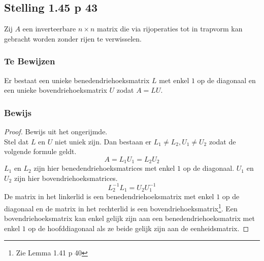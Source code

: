 \documentclass[lineaire_algebra_oplossingen.tex]{subfiles}
\begin{document}
\subsection{Stelling 1.45 p 43}
\label{1.45}
Zij $A$ een inverteerbare $n\times n$ matrix die via rijoperaties tot in trapvorm kan gebracht worden zonder rijen te verwisselen.

\subsubsection*{Te Bewijzen}
Er bestaat een unieke benedendriehoeksmatrix $L$ met enkel $1$ op de diagonaal en een unieke bovendriehoeksmatrix $U$ zodat $A=LU$.

\subsubsection*{Bewijs}
\begin{proof}
Bewijs uit het ongerijmde.\\
Stel dat $L$ en $U$ niet uniek zijn. Dan bestaan er $L_1 \neq L_2,U_1 \neq U_2$ zodat de volgende formule geldt.
\[
A = L_1U_1=L_2U_2
\]
$L_1$ en $L_2$ zijn hier benedendriehoeksmatrices met enkel $1$ op de diagonaal. $U_1$ en $U_2$ zijn hier bovendriehoeksmatrices.
\[
L_2^{-1}L_1 = U_2U_1^{-1}
\]
De matrix in het linkerlid is een benedendriehoeksmatrix met enkel $1$ op de diagonaal en de matrix in het rechterlid is een bovendriehoeksmatrix\footnote{Zie Lemma 1.41 p 40}.
Een bovendriehoeksmatrix kan enkel gelijk zijn aan een benedendriehoeksmatrix met enkel $1$ op de hoofddiagonaal als ze beide gelijk zijn aan de eenheidsmatrix.
\end{proof}
\end{document}

